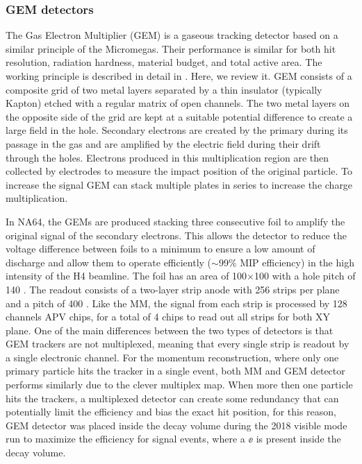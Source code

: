 \subsubsection{GEM detectors}
\label{ch2:sec:gem}
The Gas Electron Multiplier (GEM) is a gaseous tracking detector based on a similar principle of the Micromegas. Their performance is similar for both hit resolution, radiation hardness, material budget, and total active area. The working principle is described in detail in \cite{gem,SAULI20162,ABBON2007455}. Here, we review it. GEM consists of a composite grid of two metal layers separated by a thin insulator (typically Kapton) etched with a regular matrix of open channels. The two metal layers on the opposite side of the grid are kept at a suitable potential difference to create a large field in the hole. Secondary electrons are created by the primary during its passage in the gas and are amplified by the electric field during their drift through the holes. Electrons produced in this multiplication region are then collected by electrodes to measure the impact position of the original particle. To increase the signal GEM can stack multiple plates in series to increase the charge multiplication.

In NA64, the GEMs are produced stacking three consecutive foil to amplify the original signal of the secondary electrons. This allows the detector to reduce the voltage difference between foils to a minimum to ensure a low amount of discharge and allow them to operate efficiently ($\sim$99\% MIP efficiency) in the high intensity of the H4 beamline. The foil has an area of 100$\times$100 \mms with a hole pitch of 140 \mum. The readout consists of a two-layer strip anode with 256 strips per plane and a pitch of 400 \mum. Like the MM, the signal from each strip is processed by 128 channels APV chips, for a total of 4 chips to read out all strips for both XY plane.
One of the main differences between the two types of detectors is that GEM trackers are not multiplexed, meaning that every single strip is readout by a single electronic channel. For the momentum reconstruction, where only one primary particle hits the tracker in a single event, both MM and GEM detector performs similarly due to the clever multiplex map. When more then one particle hits the trackers, a multiplexed detector can create some redundancy that can potentially limit the efficiency and bias the exact hit position, for this reason, GEM detector was placed inside the decay volume during the 2018 visible mode run to maximize the efficiency for signal events, where a $\ee$ is present inside the decay volume.

